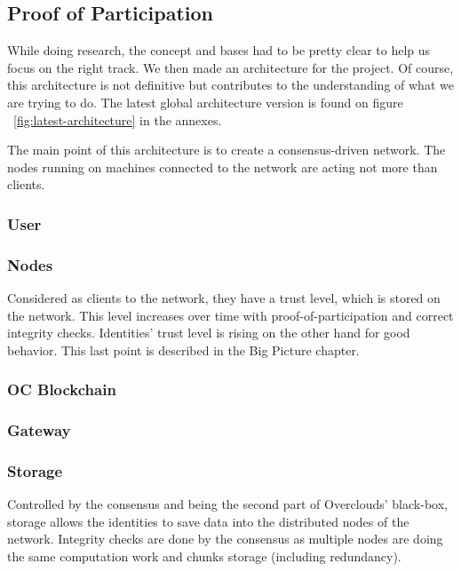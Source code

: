
\subsection{Proof of Participation}
While doing research, the concept and bases had to be pretty clear to help us focus on the right track. We then made an architecture for the project. Of course, this architecture is not definitive but contributes to the understanding of what we are trying to do. The latest global architecture version is found on figure ~\ref{fig:latest-architecture} in the annexes.

The main point of this architecture is to create a consensus-driven network. The nodes running on machines connected to the network are acting not more than clients.

\subsubsection{User} 

\subsubsection{Nodes} Considered as clients to the network, they have a trust level, which is stored on the network. This level increases over time with proof-of-participation and correct integrity checks. Identities' trust level is rising on the other hand for good behavior. This last point is described in the Big Picture chapter.

\subsubsection{OC Blockchain}

\subsubsection{Gateway} 

\subsubsection{Storage} Controlled by the consensus and being the second part of Overclouds' black-box, storage allows the identities to save data into the distributed nodes of the network. Integrity checks are done by the consensus as multiple nodes are doing the same computation work and chunks storage (including redundancy).

